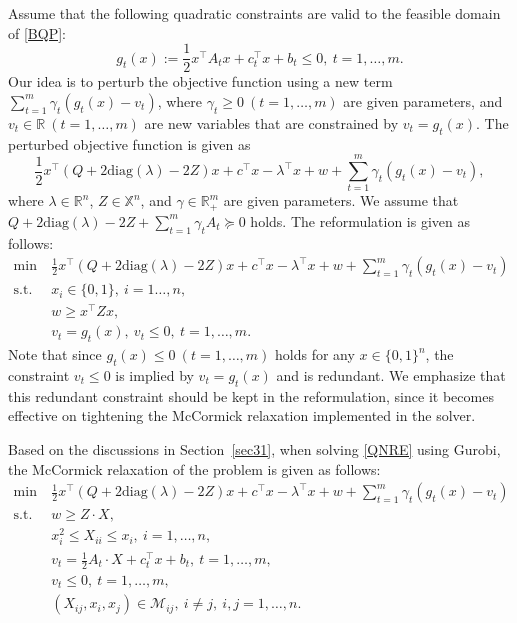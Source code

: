 \documentclass[pdflatex,sn-mathphys-num]{sn-jnl}%
\theoremstyle{thmstyleone}%
\theoremstyle{thmstyletwo}%
\theoremstyle{thmstylethree}%
\begin{document}
Assume that the following quadratic constraints are valid to the feasible domain of \eqref{BQP}:
\begin{equation}\label{gtx}
	g_t(x):=\frac{1}{2}x^\top A_t x+ c_t^\top x+b_t\leq 0,~t=1,\ldots,m.
\end{equation}
Our idea is to perturb the objective function using a new term $\sum_{t=1}^m \gamma_t (g_t(x)-v_t)$, where $\gamma_t\geq 0~(t=1,\ldots,m)$ are given parameters, and $v_t\in\mathbb{R}~(t=1,\ldots,m) $ are new variables that are constrained by $v_t= g_t(x)$. The perturbed objective function is given as
\begin{equation}
	\frac{1}{2}x^\top(Q+2\textrm{diag}(\lambda)-2Z)x+c^\top x-\lambda^\top x+w+\sum_{t=1}^m \gamma_t \left(g_t(x)-v_t\right),
\end{equation}
where $\lambda\in \mathbb{R}^n$, $Z\in\mathbb{X}^n$, and $\gamma\in\mathbb{R}^m_+$ are given parameters. We assume that $Q+2\textrm{diag}(\lambda)-2Z+\sum_{t=1}^m \gamma_t A_t\succeq 0$ holds. The reformulation is given as follows:
\begin{equation}\label{QNRE}\tag{QNRE}
	\begin{aligned}
		\min ~&\frac{1}{2}x^\top(Q+2\textrm{diag}(\lambda)-2Z)x+c^\top x-\lambda^\top x+w+\sum_{t=1}^m \gamma_t \left(g_t(x)-v_t\right)\\%
		\textrm{s.t.}~&x_i \in \{0,1\},~i=1\ldots,n,\\
		&w\geq x^\top Z x,\\
		& v_t= g_t(x),~v_t\leq 0,~t=1,\ldots,m.
	\end{aligned}
\end{equation}
Note that since $g_t(x)\leq 0~(t=1,\ldots,m)$ holds for any $x\in \{0,1\}^n$, the constraint $v_t\leq 0$ is implied by $v_t= g_t(x)$ and is redundant. We emphasize that this redundant constraint should be kept in the reformulation, since it becomes effective on tightening the McCormick relaxation implemented in the solver.

Based on the discussions in Section~\ref{sec31}, when solving \eqref{QNRE} using Gurobi, the McCormick relaxation of the problem is given as follows:
\begin{equation}\label{QCRE-MCR}
	\begin{aligned}
		\min ~&\frac{1}{2}x^\top(Q+2\textrm{diag}(\lambda)-2Z)x+c^\top x-\lambda^\top x+w+\sum_{t=1}^m \gamma_t \left(g_t(x)-v_t\right)\\
		\textrm{s.t.}~ &w\geq Z\cdot X,\\
		&x_i^2\leq X_{ii} \leq x_i,~i=1,\ldots,n,\\
		& v_t= \frac{1}{2}A_t \cdot X+ c_t^\top x+b_t,~t=1,\ldots,m,\\
		&v_t\leq 0,~t=1,\ldots,m,\\
		&(X_{ij},x_i,x_j)\in \mathcal{M}_{ij}, ~i\neq j, ~i,j=1,\ldots,n.\\
	\end{aligned}
\end{equation}
\end{document}
